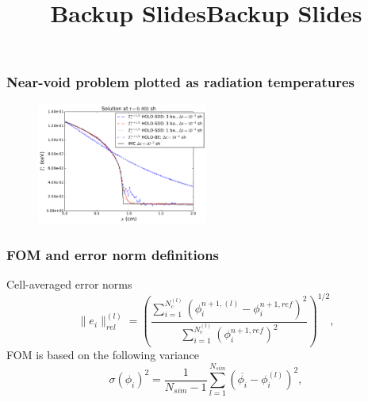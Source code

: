 \documentclass[xcolor=dvipsnames,hyperref={pdfpagelabels=false},unknownkeysallowed]{beamer}
\newcommand{\ds}[0]{\displaystyle}
\begin{document}
\setcounter{finalframe}{\value{framenumber}}
\date{}

\begin{frame}
    \titlepage \vspace{-0.213in}
    \begin{center}
    \end{center}    
\end{frame}
\appendix
\title{Backup Slides}
\begin{frame}
    \vspace{-0.21in}
    \titlepage \vspace{-0.2113in}
\end{frame}

\title{Backup Slides}
\author{}
\date{}


\begin{frame}
\frametitle{Near-void problem plotted as radiation temperatures}
\begin{figure}
  \centering
    \includegraphics[width=0.5\textwidth]{void_temp_batch_compare.pdf}
\end{figure}
\end{frame}

\begin{frame}
    \frametitle{FOM and error norm definitions}
    Cell-averaged error norms
\begin{equation}
    \|e_i\|^{{(l)}}_{rel} = \left({\frac{\ds \sum\limits_{i=1}^{N^{(l)}_c}
    \left(\phi_i^{n+1,{(l)}} - \phi_i^{n+1,ref}
\right)^2}{\ds \sum\limits_{i=1}^{N^{(l)}_c}\left(\phi_i^{n+1,ref}\right)^2}}\right)^{1/2},
\end{equation}
FOM is based on the following variance
\begin{equation} 
    \sigma(\phi_i)^2 =  \frac{1}{N_{sim}-1} \sum_{l=1}^{N_{sim}} \left(\overline{\phi_{i}} -
    \phi_{i}^{(l)}\right)^2,
\end{equation}
\end{frame}
\end{document}
